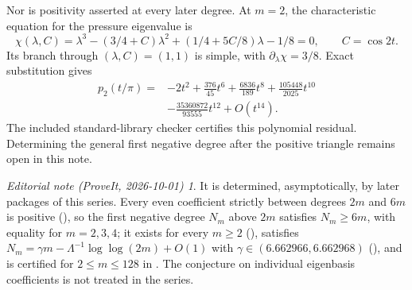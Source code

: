 \documentclass[11pt,a4paper]{article}
\theoremstyle{remark}\newtheorem*{ednote}{Editorial note (ProveIt, 2026-10-01)}
\begin{document}
Nor is positivity asserted at every later degree. At $m=2$, the characteristic equation for the pressure eigenvalue is
\[
 \chi(\lambda,C)=\lambda^3-(3/4+C)\lambda^2
                   +(1/4+5C/8)\lambda-1/8=0,
 \qquad C=\cos2t.
\]
Its branch through $(\lambda,C)=(1,1)$ is simple, with $\partial_\lambda\chi=3/8$. Exact substitution gives
\begin{align*}
 p_2(t/\pi)={}&-2t^2+\frac{376}{45}t^6+\frac{6836}{189}t^8
 +\frac{105448}{2025}t^{10}\\
 &-\frac{35360872}{93555}t^{12}+O(t^{14}).
\end{align*}
The included standard-library checker certifies this polynomial residual. Determining the general first negative degree after the positive triangle remains open in this note.
\begin{ednote}
It is determined, asymptotically, by later packages of this series. Every even coefficient
strictly between degrees $2m$ and $6m$ is positive (), so the first
negative degree $N_m$ above $2m$ satisfies $N_m\ge6m$, with equality for $m=2,3,4$; it exists
for every $m\ge2$ (), satisfies $N_m=\gamma m-\Lambda^{-1}\log\log(2m)+O(1)$ with $\gamma\in(6.662966,6.662968)$ (), and is certified for $2\le m\le128$ in
. The conjecture on individual eigenbasis coefficients
is not treated in the series.
\end{ednote}
\end{document}

